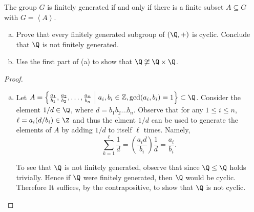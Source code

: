 \documentclass[10pt]{amsart}
\begin{document}
\begin{thm}
  The group $G$ is finitely generated if and only if there is a finite subset $A \subseteq G$ with $G = \left< A \right>$.
  
  \begin{enumerate}[(a)]
  \item
    Prove that every finitely generated subgroup of $(\Q, +)$ is cyclic.
    Conclude that $\Q$ is not finitely generated.
  \item
    Use the first part of (a) to show that $\Q \not \cong \Q \times \Q$.
  \end{enumerate}
  \begin{proof}
    \begin{enumerate}[(a)]
    \item
      Let $A = \left\{\frac{a_1}{b_1}, \frac{a_2}{b_2}, \ldots, \frac{a_n}{b_n} \;\middle\vert\; a_i, b_i \in \mathbb{Z}, \gcd(a_i,b_i) = 1\right\} \subset \Q$.
      Consider the element $1/d \in \Q$, where $d = b_1 b_2 \ldots b_n$.
      Observe that for any $1 \leq i \leq n$, $\ell = a_i(d/b_i) \in \Z$ and thus the elment $1/d$ can be used to generate the elements of $A$ by adding $1/d$ to itself $\ell$ times.
      Namely,
      $$\sum_{k=1}^{\ell} \frac{1}{d} = \left(\frac{a_i d}{b_i}\right)\frac{1}{d} = \frac{a_i}{b_i}.$$
      
      To see that $\Q$ is not finitely generated, observe that since $\Q \leq \Q$ holds trivially.
      Hence if $\Q$ were finitely generated, then $\Q$ would be cyclic.
      Therefore It suffices, by the contrapositive, to show that $\Q$ is not cyclic.


\end{enumerate}
\end{proof}
\end{thm}
\end{document}

